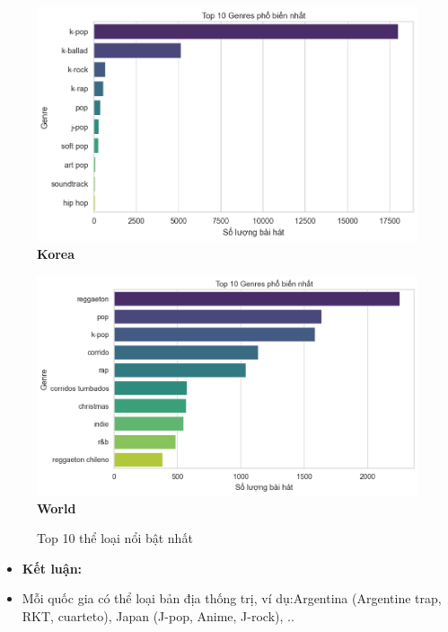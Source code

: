\begin{itemize}
\begin{figure}[H]
        \begin{minipage}{0.35\textwidth}
            \centering
            \includegraphics[width=\linewidth]{../graphics/data_top50/figure/1/EDA_south_korea.png}
            \\[4pt] {\small \textbf{Korea}}
        \end{minipage}
        \hfill
        \begin{minipage}{0.35\textwidth}
            \centering
            \includegraphics[width=\linewidth]{../graphics/data_top50/figure/1/EDA_world.png}
            \\[4pt] {\small \textbf{World}}
        \end{minipage}



        
        \caption{Top 10 thể loại nổi bật nhất}
        \label{fig:energy-regions}
    \end{figure}
    

    
    \begin{itemize}
        \item \textbf{Kết luận: }
        \item Mỗi quốc gia có thể loại bản địa thống trị, ví dụ:Argentina (Argentine trap, RKT, cuarteto), Japan (J-pop, Anime, J-rock), ..
        

\end{itemize}
\end{itemize}

